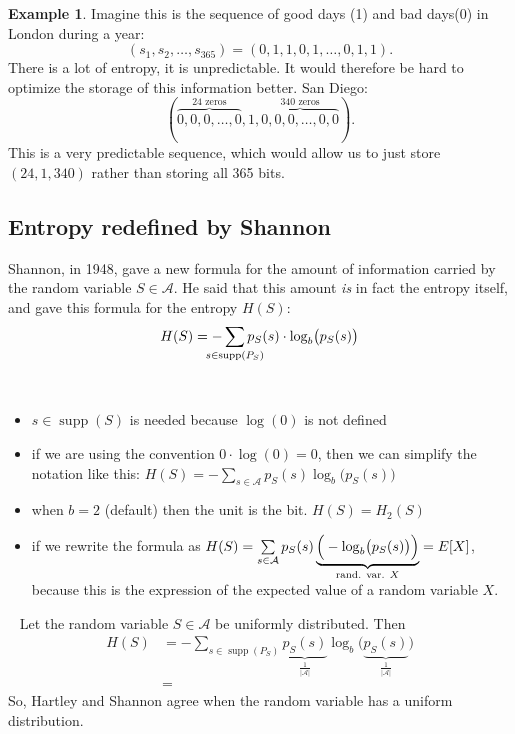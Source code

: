 \documentclass{report}
\newcommand\important[1]{\noindent {\underline{\textsc{#1}}} \ }
\DeclareMathOperator{\supp}{supp}
\theoremstyle{plain}
\theoremstyle{definition}
\newtheorem{exmp}[thm]{Example}
\theoremstyle{remark}
\begin{document}
\begin{exmp} Imagine this is the sequence of good days (1) and bad days(0) in London during a year:
\begin{equation*}
	(s_1, s_2, \dots, s_{365}) = (0, 1, 1, 0, 1, \dots, 0, 1, 1).
\end{equation*}
 There is a lot of entropy, it is unpredictable. It would therefore be hard to optimize the storage of this information better.
San Diego:
\begin{equation*}
	(\overbrace{0, 0, 0, \dots, 0}^{\text{24 zeros}}, 1, \overbrace{0, 0, 0, \dots, 0, 0}^{\text{340 zeros}}).
\end{equation*}
 This is a very predictable sequence, which would allow us to just store $(24, 1, 340)$ rather than storing all 365 bits.
\end{exmp}

\subsection{Entropy redefined by Shannon}
Shannon, in 1948, gave a new formula for the amount of information carried by the random variable $S \in \mathcal A$. He said that this amount \emph{is} in fact the entropy itself, and gave this formula for the entropy $H(S)$:
\begin{equation}
	H(S) = -\sum_{\mathclap{s \in \supp (P_S)}} p_S(s) \cdot \log_b \bigl( p_S(s) \bigr)
\end{equation}

\important{Comments}
\begin{itemize}
	\item $s \in \supp (S)$ is needed because $\log(0)$ is not defined
	\item if we are using the convention $0 \cdot \log(0) = 0$, then we can simplify the notation like this: $H(S) = - \sum_{s \in \mathcal A} p_S(s) \log_b \bigl(p_S(s)\bigr)$ 
	\item when $b=2$ (default) then the unit is the bit. $H(S) = H_2(S)$
	\item if we rewrite the formula as $H(S) = \sum\limits_{s \in \mathcal A} p_S(s) \underbrace{\Bigr(-\log_b \bigl(p_S(s)\bigl) \Bigl)}_{\text{rand. var. $X$}} = E[X]$, because this is the expression of the expected value of a random variable $X$.
\end{itemize}

\important{Example} Let the random variable $S \in \mathcal A$ be uniformly distributed. Then
\begin{align*}
	H(S) &= - \sum_{s \in \supp (P_S)} \underbrace{p_S(s)}_{\frac{1}{|\mathcal A|}} \log_b \bigl( \underbrace{p_S(s)}_{\frac{1}{|\mathcal A|}} \bigr) \\
	&=
\end{align*}
So, Hartley and Shannon agree when the random variable has a uniform distribution.
\end{document}
